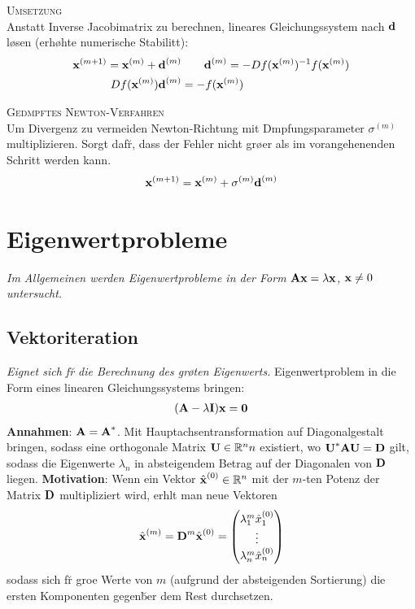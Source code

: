 \textsc{Umsetzung}\\
Anstatt Inverse Jacobimatrix zu berechnen, lineares Gleichungssystem nach $\mbox{\bf d}$ l\o sen (erh\o hte numerische Stabilit\a t):
\begin{align*}
\mbox{\bf x}^{(m+1)} = \mbox{\bf x}^{(m)} + \mbox{\bf d}^{(m)} &\qquad \mbox{\bf d}^{(m)} = -Df(\mbox{\bf x}^{(m)})^{-1}f(\mbox{\bf x}^{(m)})\\
Df(\mbox{\bf x}^{(m)})\mbox{\bf d}^{(m)} &= -f(\mbox{\bf x}^{(m)})
\end{align*}\vspace{0.2cm}

\textsc{Ged\a mpftes Newton-Verfahren}\\
Um Divergenz zu vermeiden Newton-Richtung mit D\a mpfungsparameter $\sigma^{(m)}$ multiplizieren. Sorgt daf\u r, dass der Fehler nicht gr\o \s er als im vorangehenenden Schritt werden kann.
\begin{align*}
\mbox{\bf x}^{(m+1)} = \mbox{\bf x}^{(m)} + \sigma^{(m)}\mbox{\bf d}^{(m)}
\end{align*}

\section{Eigenwertprobleme}
\emph{Im Allgemeinen werden Eigenwertprobleme in der Form $\mbox{\bf Ax}=\lambda \mbox{\bf x}$, $\mbox{\bf x}\neq 0$ untersucht.}

\subsection{Vektoriteration}
\emph{Eignet sich f\u r die Berechnung des gr\o \s ten Eigenwerts.}
Eigenwertproblem in die Form eines linearen Gleichungssystems bringen:
\begin{align*}
(\mbox{\bf A} - \lambda \mbox{\bf I}) \mbox{\bf x} = \mbox{\bf 0}
\end{align*}
\textbf{Annahmen}:
$\mbox{\bf A} = \mbox{\bf A}^*$. Mit Hauptachsentransformation auf Diagonalgestalt bringen, sodass eine orthogonale Matrix $\mbox{\bf U} \in \mathbb{R}^{n}{n}$ existiert, wo $\mbox{\bf U}^*\mbox{\bf AU}=\mbox{\bf D}$ gilt, sodass die Eigenwerte $\lambda_n$ in absteigendem Betrag auf der Diagonalen von $\mbox{\bf D}$ liegen. 
\textbf{Motivation}: Wenn ein Vektor $\hat{\mbox{\bf x}}^{(0)} \in \mathbb{R}^{n}$ mit der $m$-ten Potenz der Matrix $\mbox{\bf D}$ multipliziert wird, erh\a lt man neue Vektoren \begin{align*}
\hat{\mbox{\bf x}}^{(m)} = \mbox{\bf D}^m \hat{\mbox{\bf x}}^{(0)} = \begin{pmatrix}
\lambda_1^m \hat{x}_1^{(0)}\\
\vdots \\
\lambda_n^m \hat{x}_n^{(0)}
\end{pmatrix}
\end{align*}
sodass sich f\u r gro\s e Werte von $m$ (aufgrund der absteigenden Sortierung) die ersten Komponenten gegen\u ber dem Rest durchsetzen. \vspace{0.2cm}

